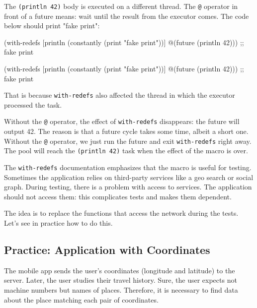 The \verb|(println 42)| body is executed on a different thread.
The \verb|@| operator in front of a future means: wait until the result from the executor comes.
The code below should print "fake print":


\ifx\DEVICETYPE\MOBILE

\begin{clojure}
(with-redefs
  [println (constantly
             (print "fake print"))]
  @(future (println 42)))
;; fake print
\end{clojure}

\else

\begin{clojure}
(with-redefs
  [println (constantly (print "fake print"))]
  @(future (println 42)))
;; fake print
\end{clojure}

\fi

That is because \verb|with-redefs| also affected the thread in which the executor processed the task.

\mnoindent
Without the \verb|@| operator, the effect of \verb|with-redefs| disappears: the future will output 42. The reason is that a future cycle takes some time, albeit a short one.
Without the \verb|@| operator, we just run the future and exit \verb|with-redefs| right away.
The pool will reach the \verb|(println 42)| task when the effect of the macro is over.

The \verb|with-redefs| documentation emphasizes that the macro is useful for testing.
Sometimes the application relies on third-party services like a geo search or social graph.
During testing, there is a problem with access to services.
The application should not access them: this complicates tests and makes them dependent.

The idea is to replace the functions that access the network during the tests.
Let's see in practice how to do this.

\subsection{Practice: Application with Coordinates}


The mobile app sends the user's coordinates (longitude and latitude) to the server.
Later, the user studies their travel history.
Sure, the user expects not machine numbers but names of places.
Therefore, it is necessary to find data about the place matching each pair of coordinates.

